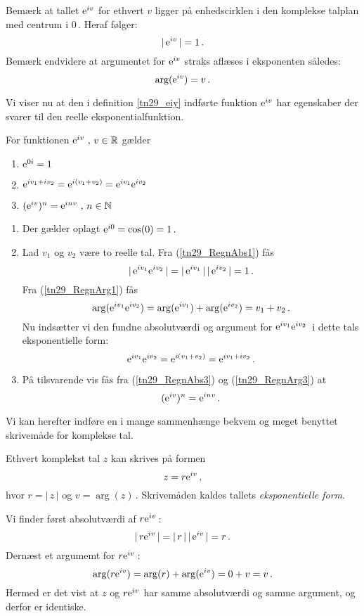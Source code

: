 \begin{aha}
Bemærk at tallet $\mathrm{e}^{iv}$ for ethvert $v$ ligger på enhedscirklen i den komplekse talplan med centrum i $0\,$. Heraf følger:
\begin{equation}
|\,\mathrm{e}^{iv}\,|=1\,.
\end{equation}
Bemærk endvidere at argumentet for $\mathrm{e}^{iv}$ straks aflæses i eksponenten således:
\begin{equation}
\arg(\mathrm{e}^{iv})=v\,.
\end{equation}
\end{aha}
Vi viser nu at den i definition \ref{tn29_eiy} indførte funktion $\mathrm{e}^{iv}$ har egenskaber der svarer til den reelle eksponentialfunktion.\bs 
\begin{theorem}\label{tn29_Th_eiy}
For funktionen $\mathrm{e}^{iv}\,\,,\,v\in \mathbb{R}$ gælder
\begin{enumerate}
\item
$\mathrm{e}^{0i}=1$
\item
$\mathrm{e}^{iv_1+iv_2}=\mathrm{e}^{i(v_1+v_2)}=\mathrm{e}^{iv_1}\mathrm{e}^{iv_2}$
\item
$(\mathrm{e}^{iv})^n=\mathrm{e}^{inv}\,\,,\,n\in\mathbb N$
\end{enumerate}
\end{theorem}
\begin{bevis}
\begin{enumerate}
\item
Der gælder oplagt $\mathrm{e}^{i0}=\cos(0)=1\,.$
\item
Lad $v_1$ og $v_2$ være to reelle tal. Fra (\ref{tn29_RegnAbs1}) fås $$|\,\mathrm{e}^{iv_1}\mathrm{e}^{iv_2}\,|=|\,\mathrm{e}^{iv_1}\,|\,|\,\mathrm{e}^{iv_2}\,|=1\,.$$
Fra (\ref{tn29_RegnArg1}) fås $$\arg(\mathrm{e}^{iv_1}\mathrm{e}^{iv_2})=\arg(\mathrm{e}^{iv_1})+\arg(\mathrm{e}^{iv_2})=v_1+v_2\,.$$
Nu indsætter vi den fundne absolutværdi og argument for $\mathrm{e}^{iv_1}\mathrm{e}^{iv_2}\,$ i dette tals eksponentielle form: 
$$\mathrm{e}^{iv_1}\mathrm{e}^{iv_2}=\mathrm{e}^{i(v_1+v_2)}=\mathrm{e}^{iv_1+iv_2}\,.$$
\item
På tilsvarende vis fås fra (\ref{tn29_RegnAbs3}) og (\ref{tn29_RegnArg3}) at 
\begin{equation}
(\mathrm{e}^{iv})^n=\mathrm{e}^{inv}\,.
\end{equation}
\end{enumerate}
\end{bevis}

Vi kan herefter indføre en i mange sammenhænge bekvem og meget benyttet skrivemåde for komplekse tal.

\begin{theorem}
Ethvert komplekst tal $z$ kan skrives på formen
\begin{equation}\label{tn29_ekspForm1}
z=r\mathrm{e}^{iv}\,,
\end{equation}
hvor $r=|\,z\,|$ og $v=\arg(z)\,$. Skrivemåden kaldes tallets \textit{eksponentielle form}.
\end{theorem}
\begin{bevis}
Vi finder først absolutværdi af $r\mathrm{e}^{iv}\,$:
$$|\,r\mathrm{e}^{iv}\,|=|\,r\,|\,|\,\mathrm{e}^{iv}\,|=r\,.$$
Dernæst et argumemt for $r\mathrm{e}^{iv}\,$:
$$\arg(r\mathrm{e}^{iv})=\arg(r)+\arg(\mathrm{e}^{iv})=0+v=v\,.$$ 
Hermed er det vist at $z$ og $r\mathrm{e}^{iv}$ har samme absolutværdi og samme argument, og derfor er identiske.
\end{bevis}

